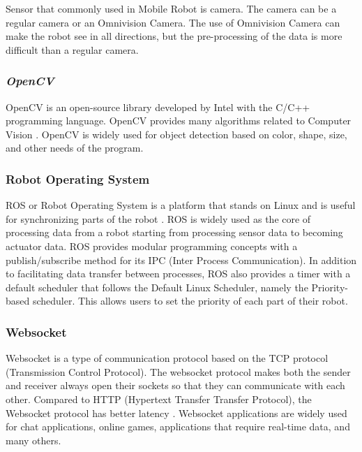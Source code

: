 Sensor that commonly used in Mobile Robot is camera. The camera can be a regular camera or an Omnivision Camera. The use of Omnivision Camera can make the robot see in all directions, but the pre-processing of the data is more difficult than a regular camera.

\subsubsection{\emph{OpenCV}}
\label{sec:opencv}
  
  

OpenCV is an open-source library developed by Intel with the C/C++ programming language. OpenCV provides many algorithms related to Computer Vision \citet{ref_opencv}. OpenCV is widely used for object detection based on color, shape, size, and other needs of the program.

\subsubsection{Robot Operating System}
\label{sec:ros}
  
  

ROS or Robot Operating System is a platform that stands on Linux and is useful for synchronizing parts of the robot \citet{ref_ros}. ROS is widely used as the core of processing data from a robot starting from processing sensor data to becoming actuator data. ROS provides modular programming concepts with a publish/subscribe method for its IPC (Inter Process Communication). In addition to facilitating data transfer between processes, ROS also provides a timer with a default scheduler that follows the Default Linux Scheduler, namely the Priority-based scheduler. This allows users to set the priority of each part of their robot.

\subsubsection{Websocket}
\label{sec:websocket}
Websocket is a type of communication protocol based on the TCP protocol (Transmission Control Protocol). The websocket protocol makes both the sender and receiver always open their sockets so that they can communicate with each other. Compared to HTTP (Hypertext Transfer Transfer Protocol), the Websocket protocol has better latency \citet{ref_websocket}. Websocket applications are widely used for chat applications, online games, applications that require real-time data, and many others.
